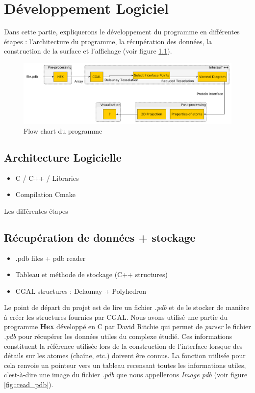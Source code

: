 \chapter{Développement Logiciel}

Dans cette partie, expliquerons le développement du programme en différentes étapes :
l'architecture du programme, la récupération des données, la construction de la surface
et l'affichage (voir figure \ref{fig::flow_chart}).

\begin{figure}[ht]
\centering
  \includegraphics[width=\textwidth]{figures/flow_chart.png}
  \caption{Flow chart du programme}
  \label{fig::flow_chart}
\end{figure}

\section{Architecture Logicielle}
\begin{itemize}
  \item C / C++ / Libraries
  \item Compilation Cmake
\end{itemize}
Les différentes étapes


\section{Récupération de données + stockage}
\begin{itemize}
  \item .pdb files + pdb reader
  \item Tableau et méthode de stockage (C++ structures)
  \item CGAL structures : Delaunay + Polyhedron
\end{itemize}

Le point de départ du projet est de lire un fichier \textit{.pdb} et de le stocker
de manière à créer les structures fournies par CGAL. Nous avons utilisé une partie du programme
\textbf{Hex} développé en C par David Ritchie qui permet de \textit{parser} le fichier
\textit{.pdb} pour récupérer les données utiles du complexe étudié. Ces informations constituent
la référence utilisée lors de la construction de l'interface lorsque des détails
sur les atomes (chaîne, etc.) doivent êre connus. La fonction utilisée pour cela
renvoie un pointeur vers un tableau recensant toutes les informations utiles, c'est-à-dire
une image du fichier \textit{.pdb} que nous appellerons \textit{Image pdb} (voir
figure \ref{fig::read_pdb}).

